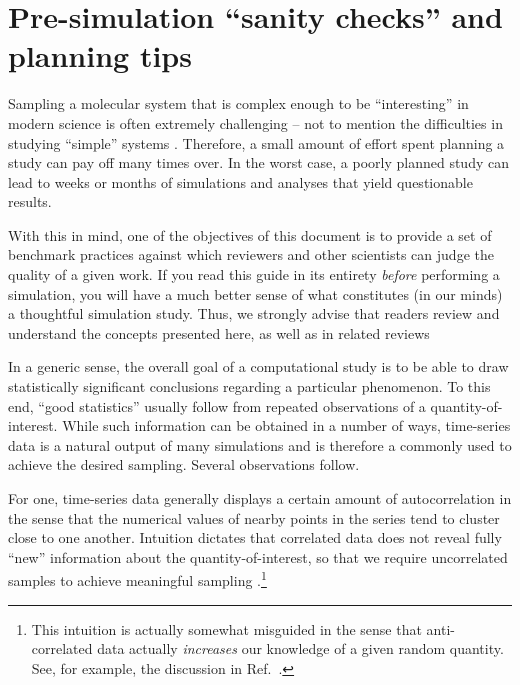 \section{Pre-simulation ``sanity checks'' and planning tips}
\label{sec:sanity}

Sampling a molecular system that is complex enough to be ``interesting'' in modern science is often extremely challenging -- not to mention the difficulties in studying ``simple'' systems \cite{Schappals2017}.
Therefore, a small amount of effort spent planning a study can pay off many times over.  In the worst case, a poorly planned study can lead to weeks or months of simulations and analyses that yield questionable results.

With this in mind, one of the objectives of this document is to provide a set of benchmark practices against which reviewers and other scientists can judge the quality of a given work.  If you read this guide in its entirety \emph{before} performing a simulation, you will have a much better sense of what constitutes (in our minds) a thoughtful simulation study.  Thus, we strongly advise that readers review and understand the concepts presented here, as well as in related reviews \cite{Grossfield2009,JCGM:GUM2008,PatroneUQreview}


In a generic sense, the overall goal of a computational study is to be able to draw statistically significant conclusions regarding a particular phenomenon.  To this end, ``good statistics'' usually follow from repeated observations of a quantity-of-interest.  While such information can be obtained in a number of ways, time-series data is a natural output of many simulations and is therefore a commonly used to achieve the desired sampling.  Several observations follow.

For one, time-series data generally displays a certain amount of autocorrelation in the sense that the numerical values of nearby points in the series tend to cluster close to one another.  Intuition dictates that correlated data does not reveal fully ``new'' information about the quantity-of-interest, so that we require uncorrelated samples to achieve meaningful sampling \cite{PatroneAIAA}.\footnote{This intuition is actually somewhat misguided in the sense that anti-correlated data actually {\it increases} our knowledge of a given random quantity.  See, for example, the discussion in Ref.~\cite{PatroneAIAA}.}  

